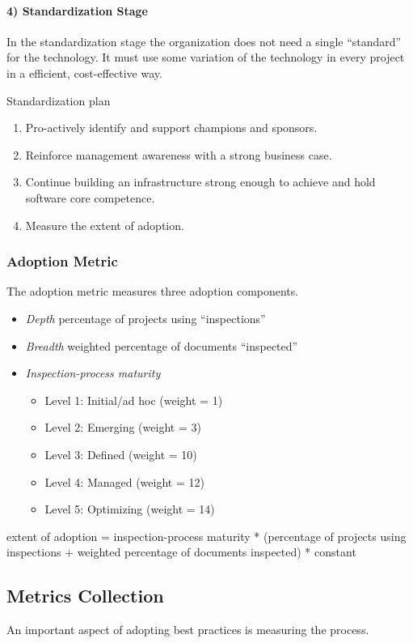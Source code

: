\paragraph{4) Standardization Stage}
In the standardization stage the organization does not need a single
``standard'' for the technology.  It must use some variation of the
technology in every project in a efficient, cost-effective way.

Standardization plan
\begin{enumerate}
\item{Pro-actively identify and support champions and sponsors.}
\item{Reinforce management awareness with a strong business case.}
\item{Continue building an infrastructure strong enough to achieve and hold
software core competence.}
\item{Measure the extent of adoption.}
\end{enumerate}

\subsubsection{Adoption Metric}

The adoption metric measures three adoption components.
\begin{itemize}
\item{{\em Depth} percentage of projects using ``inspections''}
\item{{\em Breadth} weighted percentage of documents ``inspected''}
\item{{\em Inspection-process maturity}}
  \begin{itemize}
  \item{Level 1: Initial/ad hoc (weight = 1)}
  \item{Level 2: Emerging (weight = 3)}
  \item{Level 3: Defined (weight = 10)}
  \item{Level 4: Managed (weight = 12)}
  \item{Level 5: Optimizing (weight = 14)}
  \end{itemize}
\end{itemize}

extent of adoption = inspection-process maturity * (percentage of projects
using inspections + weighted percentage of documents inspected) * constant


\cite{Grady94}


\subsection{Metrics Collection}
An important aspect of adopting best practices is measuring the process.



